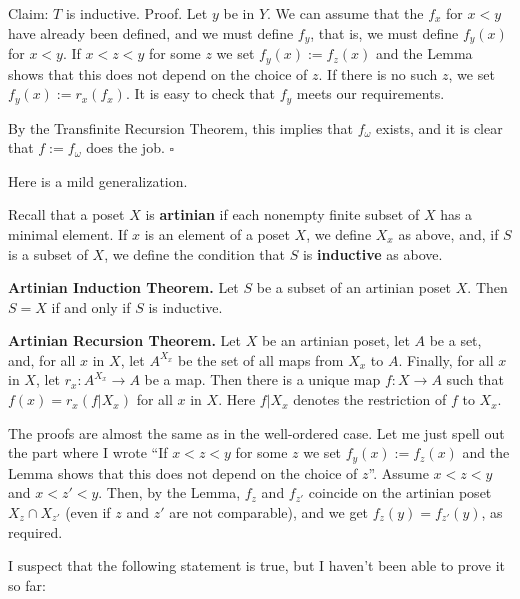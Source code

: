 \documentclass[12pt,letterpaper]{article}
\newcommand{\nn}{\noindent}
\begin{document}
\nn Claim: $T$ is inductive. Proof. Let $y$ be in $Y$. We can assume that the $f_x$ for $x<y$ have already been defined, and we must define $f_y$, that is, we must define $f_y(x)$ for $x<y$. If $x<z<y$ for some $z$ we set $f_y(x):=f_z(x)$ and the Lemma shows that this does not depend on the choice of $z$. If there is no such $z$, we set $f_y(x):=r_x(f_x)$. It is easy to check that $f_y$ meets our requirements. 

By the Transfinite Recursion Theorem, this implies that $f_\omega$ exists, and it is clear that $f:=f_\omega$ does the job. $\square$ 

Here is a mild generalization. %

Recall that a poset $X$ is \textbf{artinian} if each nonempty finite subset of $X$ has a minimal element. If $x$ is an element of a poset $X$, we define $X_x$ as above, and, if $S$ is a subset of $X$, we define the condition that $S$ is \textbf{inductive} as above. 


\nn\textbf{Artinian Induction Theorem.} Let $S$ be a subset of an artinian poset $X$. Then $S=X$ if and only if $S$ is inductive. \pagebreak 

\nn\textbf{Artinian Recursion Theorem.} Let $X$ be an artinian poset, let $A$ be a set, and, for all $x$ in $X$, let $A^{X_x}$ be the set of all maps from $X_x$ to $A$. Finally, for all $x$ in $X$, let $r_x:A^{X_x}\to A$ be a map. Then there is a unique map $f:X\to A$ such that $f(x)=r_x(f|X_x)$ for all $x$ in $X$. Here $f|X_x$ denotes the restriction of $f$ to $X_x$. 

The proofs are almost the same as in the well-ordered case. Let me just spell out the part where I wrote ``If $x<z<y$ for some $z$ we set $f_y(x):=f_z(x)$ and the Lemma shows that this does not depend on the choice of $z$''. Assume $x<z<y$ and $x<z'<y$. Then, by the Lemma, $f_z$ and $f_{z'}$ coincide on the artinian poset $X_z\cap X_{z'}$ (even if $z$ and $z'$ are not comparable), and we get $f_z(y)=f_{z'}(y)$, as required. 

I suspect that the following statement is true, but I haven't been able to prove it so far: 
\end{document}
